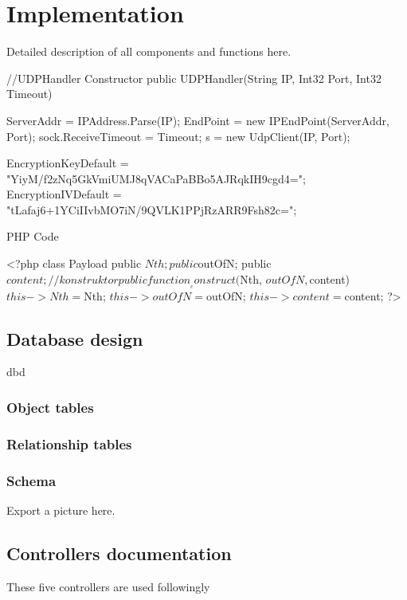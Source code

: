 \chapter{Implementation}
Detailed description of all components and  functions here.  
\begin{csharpcode}
//UDPHandler Constructor 
public UDPHandler(String IP, Int32 Port, Int32 Timeout)
{
    ServerAddr = IPAddress.Parse(IP);
    EndPoint = new IPEndPoint(ServerAddr, Port);
    sock.ReceiveTimeout = Timeout;
    s = new UdpClient(IP, Port);
    
    EncryptionKeyDefault = "YiyM/f2zNq5GkVmiUMJ8qVACaPaBBo5AJRqkIH9cgd4=";
    EncryptionIVDefault = "tLafaj6+1YCiIIvbMO7iN/9QVLK1PPjRzARR9Fsh82c=";
}
\end{csharpcode}
PHP Code
\begin{phpcode}
<?php
class Payload
{
    public $Nth;
    public $outOfN;
    public $content;
    //konstruktor
    public function __construct($Nth, $outOfN, $content)
    {
        $this->Nth = $Nth;
        $this->outOfN = $outOfN;
        $this->content = $content;
    }
}
?>
\end{phpcode}

\section{Database design}
dbd
\subsection{Object tables}
\subsection{Relationship tables}
\subsection{Schema}
Export a picture here.
\section{Controllers documentation}
\par These five controllers are used followingly
